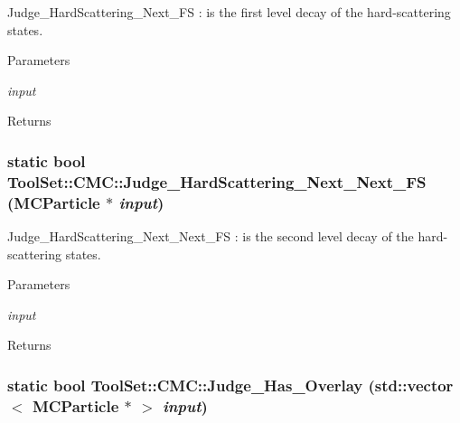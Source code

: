 Judge\_\-HardScattering\_\-Next\_\-FS : is the first level decay of the hard-\/scattering states. 
\begin{DoxyParams}{Parameters}
\item[{\em input}]\end{DoxyParams}
\begin{DoxyReturn}{Returns}

\end{DoxyReturn}
\hypertarget{classToolSet_1_1CMC_a20029373a30ff4642dfbe5ac879ee0ff}{
\subsubsection[{Judge\_\-HardScattering\_\-Next\_\-Next\_\-FS}]{\setlength{\rightskip}{0pt plus 5cm}static bool ToolSet::CMC::Judge\_\-HardScattering\_\-Next\_\-Next\_\-FS (MCParticle $\ast$ {\em input})}}
\label{classToolSet_1_1CMC_a20029373a30ff4642dfbe5ac879ee0ff}


Judge\_\-HardScattering\_\-Next\_\-Next\_\-FS : is the second level decay of the hard-\/scattering states. 
\begin{DoxyParams}{Parameters}
\item[{\em input}]\end{DoxyParams}
\begin{DoxyReturn}{Returns}

\end{DoxyReturn}
\hypertarget{classToolSet_1_1CMC_a257af2810ec961f3e1a71f29bc12154f}{
\subsubsection[{Judge\_\-Has\_\-Overlay}]{\setlength{\rightskip}{0pt plus 5cm}static bool ToolSet::CMC::Judge\_\-Has\_\-Overlay (std::vector$<$ MCParticle $\ast$ $>$ {\em input})}}
\label{classToolSet_1_1CMC_a257af2810ec961f3e1a71f29bc12154f}


